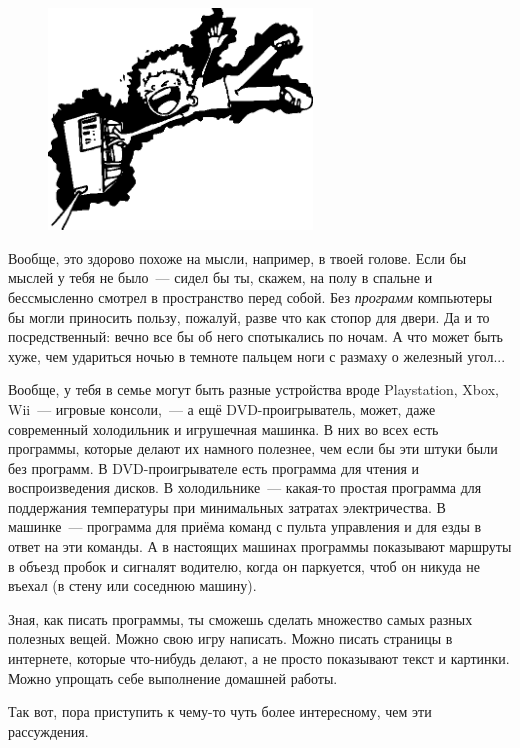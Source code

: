 \begin{figure}
  \begin{center}
\includegraphics*[width=70mm]{../en/electrocute.eps}
  \end{center}
\end{figure}

Вообще, это здорово похоже на мысли, например, в твоей голове. Если бы мыслей у тебя не было — сидел бы ты, скажем, на полу в спальне и бессмысленно смотрел в пространство перед собой. Без \emph{программ} компьютеры бы могли приносить пользу, пожалуй, разве что как стопор для двери. Да и то посредственный: вечно все бы об него спотыкались по ночам. А что может быть хуже, чем удариться ночью в темноте пальцем ноги с размаху о железный угол...


Вообще, у тебя в семье могут быть разные устройства вроде Playstation, Xbox, Wii — игровые консоли, — а ещё DVD-проигрыватель, может, даже современный холодильник и игрушечная машинка. В них во всех есть программы, которые делают их намного полезнее, чем если бы эти штуки были без программ. В DVD-проигрывателе есть программа для чтения и воспроизведения дисков. В холодильнике — какая-то простая программа для поддержания температуры при минимальных затратах электричества. В машинке — программа для приёма команд с пульта управления и для езды в ответ на эти команды. А в настоящих машинах программы показывают маршруты в объезд пробок и сигналят водителю, когда он паркуется, чтоб он никуда не въехал (в стену или соседнюю машину).

Зная, как писать программы, ты сможешь сделать множество самых разных полезных вещей. Можно свою игру написать. Можно писать страницы в интернете, которые что-нибудь делают, а не просто показывают текст и картинки. Можно упрощать себе выполнение домашней работы.

Так вот, пора приступить к чему-то чуть более интересному, чем эти рассуждения.

